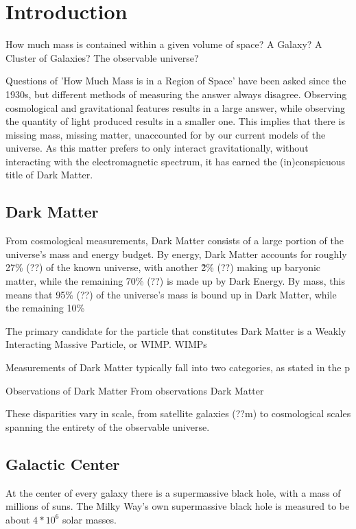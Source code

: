 \cleartooddpage[\thispagestyle{empty}]
\chapter{Introduction}

How much mass is contained within a given volume of space?
A Galaxy?
A Cluster of Galaxies?
The observable universe?

Questions of 'How Much Mass is in a Region of Space' have been asked since the 1930s, but different methods of measuring the answer always disagree.
Observing cosmological and gravitational features results in a large answer, while observing the quantity of light produced results in a smaller one.
This implies that there is missing mass, missing matter, unaccounted for by our current models of the universe.
As this matter prefers to only interact gravitationally, without interacting with the electromagnetic spectrum, it has earned the (in)conspicuous title of Dark Matter.


\section{Dark Matter}

From cosmological measurements, Dark Matter consists of a large portion of the universe's mass and energy budget.
By energy, Dark Matter accounts for roughly 27\% (??) of the known universe, with another \~2\% (??) making up baryonic matter, while the remaining 70\% (??) is made up by Dark Energy.
By mass, this means that 95\% (??) of the universe's mass is bound up in Dark Matter, while the remaining 10\%



The primary candidate for the particle that constitutes Dark Matter is a Weakly Interacting Massive Particle, or WIMP.
WIMPs 

Measurements of Dark Matter typically fall into two categories, as stated in the p

Observations of Dark Matter
From observations
Dark Matter 

These disparities vary in scale, from satellite galaxies (??m) to cosmological scales spanning the entirety of the observable universe.




\section{Galactic Center}

At the center of every galaxy there is a supermassive black hole, with a mass of millions of suns.
The Milky Way's own supermassive black hole is measured to be about $4*10^6$ solar masses.


